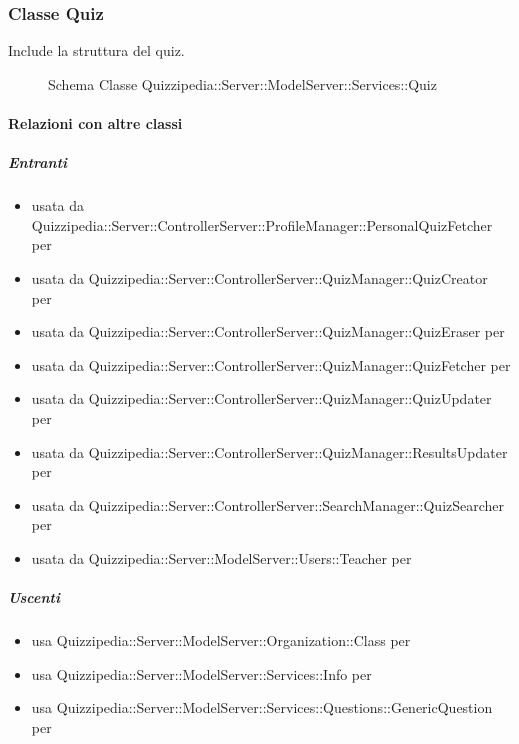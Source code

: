\subsubsection{Classe Quiz}
Include la struttura del quiz.
\begin{figure}[H]
\centering
\noindent{}
\caption[Schema Classe Quiz]{Schema Classe Quizzipedia::Server::ModelServer::Services::Quiz}
\end{figure}
\paragraph{Relazioni con altre classi}
\subparagraph{Entranti}
\begin{itemize}
\item usata da Quizzipedia::Server::ControllerServer::ProfileManager::PersonalQuizFetcher per 
\item usata da Quizzipedia::Server::ControllerServer::QuizManager::QuizCreator per 
\item usata da Quizzipedia::Server::ControllerServer::QuizManager::QuizEraser per 
\item usata da Quizzipedia::Server::ControllerServer::QuizManager::QuizFetcher per 
\item usata da Quizzipedia::Server::ControllerServer::QuizManager::QuizUpdater per 
\item usata da Quizzipedia::Server::ControllerServer::QuizManager::ResultsUpdater per 
\item usata da Quizzipedia::Server::ControllerServer::SearchManager::QuizSearcher per 
\item usata da Quizzipedia::Server::ModelServer::Users::Teacher per 
\end{itemize}
\subparagraph{Uscenti}
\begin{itemize}
\item usa Quizzipedia::Server::ModelServer::Organization::Class per 
\item usa Quizzipedia::Server::ModelServer::Services::Info per 
\item usa Quizzipedia::Server::ModelServer::Services::Questions::GenericQuestion per 
\end{itemize}
